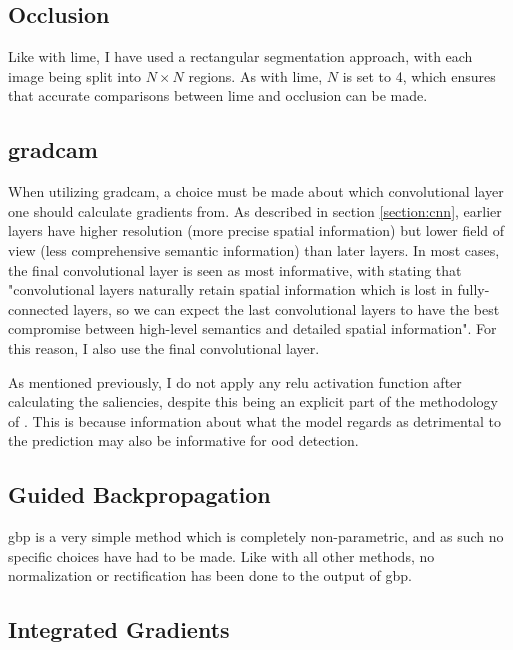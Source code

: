\documentclass[UKenglish]{uiomasterthesis} %
\theoremstyle{definition}
\begin{document}
\subsection{Occlusion}

Like with \ac{lime}, I have used a rectangular segmentation approach, with each image being split into $N \times N$ regions. As with \ac{lime}, $N$ is set to 4, which ensures that accurate comparisons between \ac{lime} and occlusion can be made.

\subsection{\ac{gradcam}}

When utilizing \ac{gradcam}, a choice must be made about which convolutional layer one should calculate gradients from. As described in section \ref{section:cnn}, earlier layers have higher resolution (more precise spatial information) but lower field of view (less comprehensive semantic information) than later layers. In most cases, the final convolutional layer is seen as most informative, with \cite{gradcam} stating that "convolutional layers naturally retain spatial information which is lost in fully-connected layers, so we can expect the last convolutional layers to have the best compromise between high-level semantics and detailed spatial information". For this reason, I also use the final convolutional layer.

As mentioned previously, I do not apply any \ac{relu} activation function after calculating the saliencies, despite this being an explicit part of the methodology of \cite{gradcam}. This is because information about what the model regards as detrimental to the prediction may also be informative for \ac{ood} detection.

\subsection{Guided Backpropagation}

\ac{gbp} is a very simple method which is completely non-parametric, and as such no specific choices have had to be made. Like with all other methods, no normalization or rectification has been done to the output of \ac{gbp}.

\subsection{Integrated Gradients}
\end{document}
